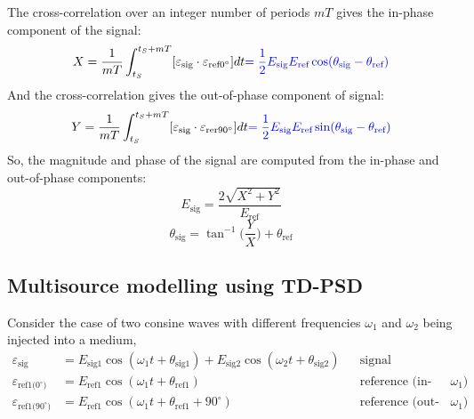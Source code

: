 The cross-correlation over an integer number of periods $mT$ gives
the in-phase component of the signal:
\[ X = \frac{1}{mT} \int_{t_S}^{t_S + mT} [ \varepsilon_\text{sig} \cdot
  \varepsilon_{\text{ref0}^\circ} ] dt {\color{blue} = \frac{1}{2} E_\text{sig}
  E_\text{ref} \cos(\theta_\text{sig} - \theta_\text{ref}) } \]
And the cross-correlation gives the out-of-phase component of signal:
\[ Y = \frac{1}{mT} \int_{t_S}^{t_S + mT} [ \varepsilon_\text{sig} \cdot
  \varepsilon_{\text{rer90}^\circ} ] dt {\color{blue} = \frac{1}{2} E_\text{sig}
  E_\text{ref} \sin(\theta_\text{sig} - \theta_\text{ref}) } \]
So, the magnitude and phase of the signal are computed from the in-phase
and out-of-phase components:
\[ E_\text{sig} = \frac{2 \sqrt{X^2 + Y^2}}{E_\text{ref}} \]
\[ \theta_\text{sig} = \tan^{-1} \Big( \frac{Y}{X} \Big) + \theta_\text{ref} \]

\subsection{Multisource modelling using TD-PSD}
Consider the case of two consine waves with different frequencies $\omega_1$ and
$\omega_2$ being injected into a medium,
\begin{align*}
  \varepsilon_\text{sig} & = E_\text{sig1} \cos(\omega_1 t + \theta_\text{sig1})
    + E_\text{sig2} \cos(\omega_2 t + \theta_\text{sig2}) & & \text{signal} \\
  \varepsilon_\text{ref1($0^\circ$)} & = E_\text{ref1} \cos(\omega_1 t
    + \theta_\text{ref1}) & & \text{reference (in-phase $\omega_1$)} \\
  \varepsilon_\text{ref1($90^\circ$)} & = E_\text{ref1} \cos(\omega_1 t
    + \theta_\text{ref1} + 90^\circ)
    & & \text{reference (out-of-phase $\omega_1$)} \\
\end{align*}


